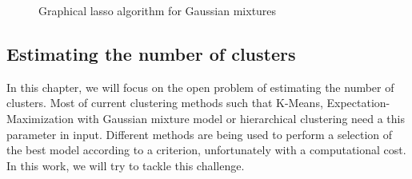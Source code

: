 \begin{figure}
\begin{center}
   \caption{Graphical lasso algorithm for Gaussian mixtures}
   \label{algo:graph_lasso_EM}
\end{center}
\end{figure}


\subsection{Estimating the number of clusters}
\label{estim_nb_clusters_sect}
In this chapter, we will focus on the open problem of estimating the number of clusters. Most of current clustering methods such that K-Means, Expectation-Maximization with Gaussian mixture model or hierarchical clustering need a this parameter in input. Different methods are being used to perform a selection of the best model according to a criterion, unfortunately with a computational cost. In this work, we will try to tackle this challenge.


